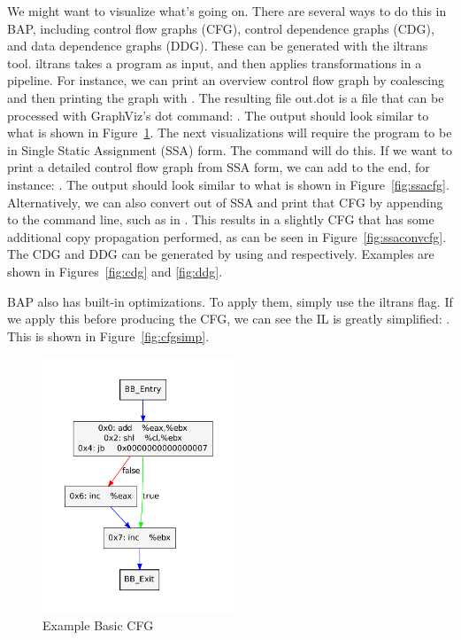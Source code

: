 We might want to visualize what's going on.  There are several ways to
do this in BAP, including control flow graphs (CFG), control
dependence graphs (CDG), and data dependence graphs (DDG).  These can
be generated with the iltrans tool.  iltrans takes a program as input,
and then applies transformations in a pipeline.  For instance, we can
print an overview control flow graph by coalescing and then printing
the graph with . The resulting file out.dot is a
file that can be processed with GraphViz's dot command: .  The output should look similar to what
is shown in Figure~\ref{fig:basiccfg}. The next visualizations will
require the program to be in Single Static Assignment (SSA) form.  The
command  will do this.  If we
want to print a detailed control flow graph from SSA form, we can add
 to the end, for instance: . The output should look similar to
what is shown in Figure~\ref{fig:ssacfg}. Alternatively, we can also
convert out of SSA and print that CFG by appending  to the command line, such as in
. This results in a slightly CFG that has some additional
copy propagation performed, as can be seen in
Figure~\ref{fig:ssaconvcfg}. The CDG and DDG can be generated by using
 and  respectively. Examples
are shown in Figures~\ref{fig:cdg} and \ref{fig:ddg}.

BAP also has built-in optimizations.  To apply them, simply use the
 iltrans flag.  If we apply this before producing
the CFG, we can see the IL is greatly simplified: . This is shown in
Figure~\ref{fig:cfgsimp}.

\begin{figure}[!p]
  \begin{center}
    \includegraphics[height=3in]{chap-examples/basiccfg.pdf}
  \end{center}
  \caption{Example Basic CFG}
  \label{fig:basiccfg}
\end{figure}

